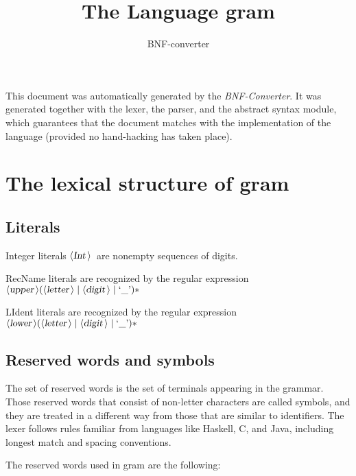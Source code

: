 \documentclass[a4paper,11pt]{article}
\author{BNF-converter}
\title{The Language gram}
\begin{document}
\maketitle

\newcommand{\emptyP}{\mbox{$\epsilon$}}
\newcommand{\terminal}[1]{\mbox{{\texttt {#1}}}}
\newcommand{\nonterminal}[1]{\mbox{$\langle \mbox{{\sl #1 }} \! \rangle$}}
\newcommand{\arrow}{\mbox{::=}}
\newcommand{\delimit}{\mbox{$|$}}
\newcommand{\reserved}[1]{\mbox{{\texttt {#1}}}}
\newcommand{\literal}[1]{\mbox{{\texttt {#1}}}}
\newcommand{\symb}[1]{\mbox{{\texttt {#1}}}}

This document was automatically generated by the {\em BNF-Converter}. It was generated together with the lexer, the parser, and the abstract syntax module, which guarantees that the document matches with the implementation of the language (provided no hand-hacking has taken place).

\section*{The lexical structure of gram}

\subsection*{Literals}
Integer literals \nonterminal{Int}\ are nonempty sequences of digits.





RecName literals are recognized by the regular expression
\({\nonterminal{upper}} ({\nonterminal{letter}} \mid {\nonterminal{digit}} \mid \mbox{`\_'})*\)

LIdent literals are recognized by the regular expression
\({\nonterminal{lower}} ({\nonterminal{letter}} \mid {\nonterminal{digit}} \mid \mbox{`\_'})*\)


\subsection*{Reserved words and symbols}
The set of reserved words is the set of terminals appearing in the grammar. Those reserved words that consist of non-letter characters are called symbols, and they are treated in a different way from those that are similar to identifiers. The lexer follows rules familiar from languages like Haskell, C, and Java, including longest match and spacing conventions.

The reserved words used in gram are the following: \\
\end{document}
